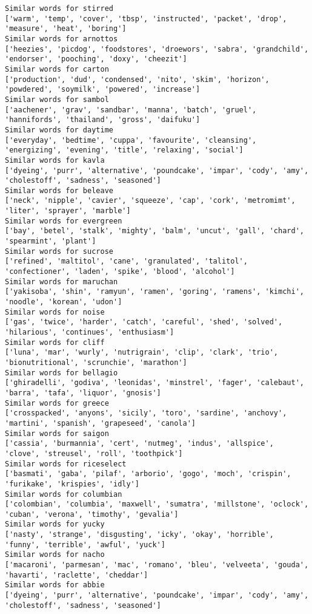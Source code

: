 \documentclass[11pt]{article}
\begin{document}
\begin{Verbatim}[commandchars=\\\{\}]
Similar words for stirred
['warm', 'temp', 'cover', 'tbsp', 'instructed', 'packet', 'drop', 'measure', 'heat', 'boring']
Similar words for arnottos
['heezies', 'picdog', 'foodstores', 'droewors', 'sabra', 'grandchild', 'endorser', 'pooching', 'doxy', 'cheezit']
Similar words for carton
['production', 'dud', 'condensed', 'nito', 'skim', 'horizon', 'powdered', 'soymilk', 'powered', 'increase']
Similar words for sambol
['aachener', 'grav', 'sandbar', 'manna', 'batch', 'gruel', 'hannifords', 'thailand', 'gross', 'daifuku']
Similar words for daytime
['everyday', 'bedtime', 'cuppa', 'favourite', 'cleansing', 'energizing', 'evening', 'title', 'relaxing', 'social']
Similar words for kavla
['dyeing', 'purr', 'alternative', 'poundcake', 'impar', 'cody', 'amy', 'cholestoff', 'sadness', 'seasoned']
Similar words for beleave
['neck', 'nipple', 'cavier', 'squeeze', 'cap', 'cork', 'metromimt', 'liter', 'sprayer', 'marble']
Similar words for evergreen
['bay', 'betel', 'stalk', 'mighty', 'balm', 'uncut', 'gall', 'chard', 'spearmint', 'plant']
Similar words for sucrose
['refined', 'maltitol', 'cane', 'granulated', 'talitol', 'confectioner', 'laden', 'spike', 'blood', 'alcohol']
Similar words for maruchan
['yakisoba', 'shin', 'ramyun', 'ramen', 'goring', 'ramens', 'kimchi', 'noodle', 'korean', 'udon']
Similar words for noise
['gas', 'twice', 'harder', 'catch', 'careful', 'shed', 'solved', 'hilarious', 'continues', 'enthusiasm']
Similar words for cliff
['luna', 'mar', 'wurly', 'nutrigrain', 'clip', 'clark', 'trio', 'bionutritional', 'scrunchie', 'marathon']
Similar words for bellagio
['ghiradelli', 'godiva', 'leonidas', 'minstrel', 'fager', 'calebaut', 'barra', 'tafa', 'liquor', 'gnosis']
Similar words for greece
['crosspacked', 'anyons', 'sicily', 'toro', 'sardine', 'anchovy', 'martini', 'spanish', 'grapeseed', 'canola']
Similar words for saigon
['cassia', 'burmannia', 'cert', 'nutmeg', 'indus', 'allspice', 'clove', 'streusel', 'roll', 'toothpick']
Similar words for riceselect
['basmati', 'gaba', 'pilaf', 'arborio', 'gogo', 'moch', 'crispin', 'furikake', 'krispies', 'idly']
Similar words for columbian
['colombian', 'columbia', 'maxwell', 'sumatra', 'millstone', 'oclock', 'cuban', 'verona', 'timothy', 'gevalia']
Similar words for yucky
['nasty', 'strange', 'disgusting', 'icky', 'okay', 'horrible', 'funny', 'terrible', 'awful', 'yuck']
Similar words for nacho
['macaroni', 'parmesan', 'mac', 'romano', 'bleu', 'velveeta', 'gouda', 'havarti', 'raclette', 'cheddar']
Similar words for abbie
['dyeing', 'purr', 'alternative', 'poundcake', 'impar', 'cody', 'amy', 'cholestoff', 'sadness', 'seasoned']

\end{Verbatim}
\end{document}
